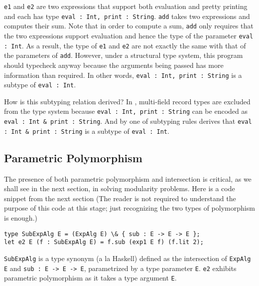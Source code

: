 

\lstinline{e1} and \lstinline{e2} are two expressions that support both evaluation and pretty
printing and each has type \lstinline{eval : Int, print : String}. \lstinline{add} takes
two expressions and computes their sum. Note that in order to compute a sum,
\lstinline{add} only requires that the two expressions support evaluation and hence the
type of the parameter \lstinline{eval : Int}. As a result, the type of \lstinline{e1} and
\lstinline{e2} are not exactly the same with that of the parameters of \lstinline{add}. However,
under a structural type system, this program should typecheck anyway because the
arguments being passed has more information than required. In other words,
\lstinline{eval : Int, print : String} is a subtype of \lstinline{eval : Int}.

How is this subtyping relation derived? In \name, multi-field record types are
excluded from the type system because \lstinline{eval : Int, print : String} can
be encoded as \lstinline{eval : Int & print : String}. And by one of
subtyping rules derives that \lstinline{eval : Int & print : String} is a
subtype of \lstinline{eval : Int}.



\subsection{Parametric Polymorphism}

The presence of both parametric polymorphism and intersection is critical, as we
shall see in the next section, in solving modularity problems. Here is a code
snippet from the next section (The reader is not required to understand the
purpose of this code at this stage; just recognizing the two types of
polymorphism is enough.)
\begin{lstlisting}
type SubExpAlg E = (ExpAlg E) \& { sub : E -> E -> E };
let e2 E (f : SubExpAlg E) = f.sub (exp1 E f) (f.lit 2);
\end{lstlisting}
\lstinline{SubExpAlg} is a type synonym (a la Haskell) defined as the intersection of
\lstinline{ExpAlg E} and \lstinline{sub : E -> E -> E}, parametrized by a type parameter
\lstinline{E}. \lstinline{e2} exhibits parametric polymorphism as it takes a type argument
\lstinline{E}.

